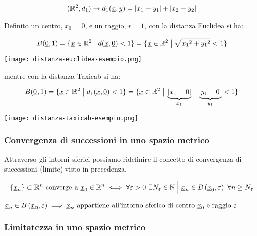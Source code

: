 \[
    (\R^{2},d_1) \rightarrow d_1(\ux,\uy) = |x_1-y_1| + |x_2-y_2|
\]

\vspace{6mm}
Definito un centro, \(x_0=0\), e un raggio, \(r=1\), con la distanza Euclidea si ha:

\[
    B(\uzero,1) = \{\ux \in \R^2 \giventhat d(\ux,\uzero) <1\} = \{\ux \in \R^2 \giventhat \sqrt{{x_1}^2+{y_1}^2}<1\}
\]

\begin{center}
    \texttt{[image: distanza-euclidea-esempio.png]}
\end{center}

mentre con la distanza Taxicab si ha:

\[
    B(\uzero,1) = \{\ux \in \R^2 \giventhat d_1(\ux,\uzero) <1\} = \{\ux \in \R^2 \giventhat \underbrace{|x_1-0|}_{x_1} + \underbrace{|y_1-0|}_{y_1}<1\}
\]

\begin{center}
    \texttt{[image: distanza-taxicab-esempio.png]}
\end{center}

\pagebreak

\subsubsection{Convergenza di successioni in uno spazio metrico}

Attraverso gli intorni sferici possiamo ridefinire il concetto di convergenza di successioni (limite) visto in precedenza.

\begin{align*}
    \{\ux_n\} \subset \Rn \text{ converge a } \ux_0 \in \Rn
    \iff
    \forall \varepsilon >0 ~\exists N_\varepsilon \in \N
    \giventhat[\Big]
    \ux_n \in B\left(\ux_0,\varepsilon\right) ~\forall n \ge N_\varepsilon
\end{align*}

\(
\ux_n \in B\left(\ux_0,\varepsilon\right) \implies \ux_n \text{ appartiene all'intorno sferico di centro } \ux_0 \text{ e raggio } \varepsilon
\)

\pagebreak

\subsubsection{Limitatezza in uno spazio metrico}


